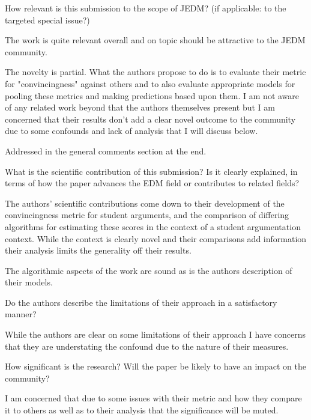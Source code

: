 \documentclass[notitlepage,12pt]{article}
\begin{document}
\begin{revcomment}{How relevant is this submission to the scope of JEDM? (if applicable: to the targeted special issue?)}
  
    The work is quite relevant overall and on topic should be attractive to the JEDM community.

    The novelty is partial. What the authors propose to do is to evaluate their metric for "convincingness" against others and to also evaluate appropriate models for pooling these metrics and making predictions based upon them. I am not aware of any related work beyond that the authors themselves present but I am concerned that their results don't add a clear novel outcome to the community due to some confounds and lack of analysis that I will discuss below.
    
\begin{authors}
Addressed in the general comments section at the end.
\end{authors}

\end{revcomment}

    \begin{revcomment}{What is the scientific contribution of this submission? Is it clearly explained, in terms of how the paper advances the EDM field or contributes to related fields?}

    The authors' scientific contributions come down to their development of the convincingness metric for student arguments, and the comparison of differing algorithms for estimating these scores in the context of a student argumentation context. While the context is clearly novel and their comparisons add information their analysis limits the generality off their results.

      
    The algorithmic aspects of the work are sound as is the authors description of their models.

    \end{revcomment}

    \begin{revcomment}{Do the authors describe the limitations of their approach in a satisfactory manner?}

    While the authors are clear on some limitations of their approach I have concerns that they are understating the confound due to the nature of their measures.
    \end{revcomment}

    \begin{revcomment}{How significant is the research? Will the paper be likely to have an impact on the community?}


    I am concerned that due to some issues with their metric and how they compare it to others as well as to their analysis that the significance will be muted.
    \end{revcomment}
\end{document}
